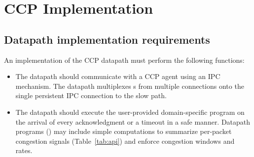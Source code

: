 \section{CCP Implementation}
\label{s:datapath}
%
\subsection{Datapath implementation requirements}
\label{sec:implementation-basics}

An implementation of the CCP datapath must perform the following functions:
\begin{itemize}
\item The datapath should communicate with a \userspace CCP agent using an IPC
  mechanism. The datapath multiplexes s from multiple connections
  onto the single persistent IPC connection to the slow path.
\item The datapath should execute the user-provided domain-specific program on
  the arrival of every acknowledgment or a timeout in a safe manner. Datapath
  programs () may include simple computations to summarize
  per-packet congestion signals (Table~\ref{tab:api}) and enforce congestion
  windows and rates.
\end{itemize}


